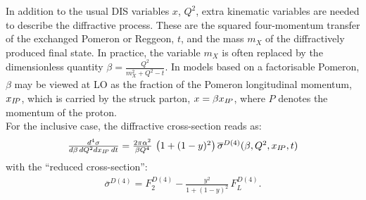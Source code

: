 In addition to the usual DIS variables $x$, $Q^2$, extra kinematic variables are needed to describe the diffractive process. These are the squared four-momentum transfer of the exchanged Pomeron or Reggeon, $t$, and 
the mass $m_X$ of the diffractively produced final state. 
In practice, the variable $m_X$ 
is often replaced by the dimensionless quantity $\beta=\frac{Q^2}{m_X^2+Q^2-t}$.
In models based on a factorisable Pomeron, $\beta$ may be viewed at LO as the fraction of the
Pomeron longitudinal momentum, $x_{{I\!P}}$, which is carried by the struck parton, $x=\beta x_{{I\!P}}$,
where $P$ denotes the momentum of the proton.
\\
For the inclusive case, the diffractive cross-section reads as:
\begin{equation}
\begin{array}{lcl}
    \frac{d^4\sigma}{d\beta\,dQ^2dx_{{I\!P}}\,dt}
=
  \frac{2\pi\alpha^2}{\beta Q^4}\,
    \left( 1 +  (1-y)^2 \right) \overline\sigma^{D(4)}(\beta,Q^2,x_{{I\!P}},t)
\label{Dxs}
\end{array}
\end{equation}
with the ``reduced cross-section'': 
\begin{equation}
\begin{array}{lcl}
\overline\sigma^{D(4)}
 = F_2^{D(4)} - \frac{y^2}{1 +  (1-y)^2}\, F_L^{D(4)}.
\label{eq:sigred}
\end{array}
\end{equation}

